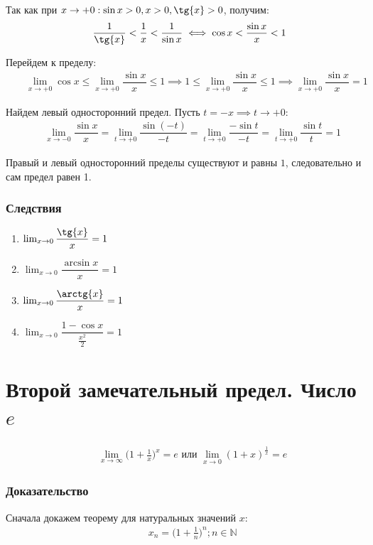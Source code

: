 \documentclass[12pt, fleqn]{extarticle}
\begin{document}
Так как при \(x \to +0: \sin{x} > 0, x > 0, \tg{x} > 0\), получим:
\begin{align*}
     &  &
    \dfrac{1}{\tg{x}} < \dfrac{1}{x} < \dfrac{1}{\sin{x}} \iff \cos{x} < \dfrac{\sin{x}}{x} < 1
\end{align*}

Перейдем к пределу:
\begin{align*}
     &  &
    \lim_{x \to +0}{\cos{x}} \leq \lim_{x \to +0}{\dfrac{\sin{x}}{x}} \leq 1 \implies 1 \leq \lim_{x \to +0}{\dfrac{\sin{x}}{x}} \leq 1 \implies \lim_{x \to +0}{\dfrac{\sin{x}}{x}} = 1
\end{align*}

Найдем левый односторонний предел. Пусть \(t = -x \implies t \to +0\):
\begin{align*}
     &  &
    \lim_{x \to -0}{\dfrac{\sin{x}}{x}} = \lim_{t \to +0}{\dfrac{\sin{(-t)}}{-t}} = \lim_{t \to +0}{\dfrac{-\sin{t}}{-t}} = \lim_{t \to +0}{\dfrac{\sin{t}}{t}} = 1
\end{align*}

Правый и левый односторонний пределы существуют и равны \(1\), следовательно и сам предел равен 1.

\subsubsection*{Следствия}
\begin{enumerate}
    \item {\(\lim_{x \to 0}{\dfrac{\tg{x}}{x}} = 1\)}
    \item {\(\lim_{x \to 0}{\dfrac{\arcsin{x}}{x}} = 1\)}
    \item {\(\lim_{x \to 0}{\dfrac{\arctg{x}}{x}} = 1\)}
    \item {\(\lim_{x \to 0}{\dfrac{1 - \cos{x}}{\frac{x^2}{2}}} = 1\)}
\end{enumerate}

\newpage

\section{Второй замечательный предел. Число \(e\)}\label{sec:limit_2}
\begin{align*}
     &  &
    \lim_{x \to \infty}{\Big(1 + \frac{1}{x}\Big)^x} = e \text{ или } \lim_{x \to 0}{(1 + x)^\frac{1}{x}} = e
\end{align*}

\subsubsection*{Доказательство}
Сначала докажем теорему для натуральных значений \(x\):
\begin{align*}
     &  &
    x_n = \Big(1 + \frac{1}{n}\Big)^n; n \in \mathbb{N}
\end{align*}
\end{document}

